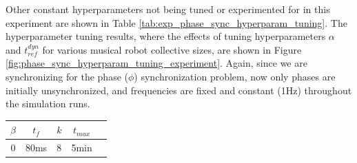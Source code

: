 	Other constant hyperparameters not being tuned or experimented for in this experiment are shown in Table \ref{tab:exp_phase_sync_hyperparam_tuning}. The hyperparameter tuning results, where the effects of tuning hyperparameters $\alpha$ and $t_{ref}^{dyn}$ for various musical robot collective sizes, are shown in Figure \ref{fig:phase_sync_hyperparam_tuning_experiment}. Again, since we are synchronizing for the phase ($\phi$) synchronization problem, now only phases are initially unsynchronized, and frequencies are fixed and constant (1Hz) throughout the simulation runs.
	
	\begin{center}
	\begin{tabular}{ |c|c|c|c|c| } 
	\hline
	$\beta$ & $t_f$ & $k$ & $t_{max}$ \\
	\hline
	0 & 80ms & 8 & 5min \\
	\hline
	\end{tabular}
	\label{tab:exp_phase_sync_hyperparam_tuning}
	\end{center}
	
